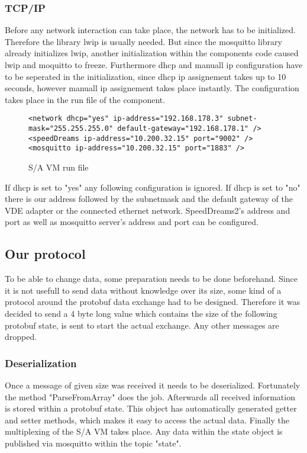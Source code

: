 \documentclass[paper=a4, fontsize=11pt]{scrartcl}
\begin{document}
  \subsubsection{TCP/IP} \label{tcpip}
Before any network interaction can take place, the network has to be initialized. Therefore the library lwip is usually needed. But since the mosquitto library already initializes lwip, another initialization within the components code caused lwip and moquitto to freeze.\newline
Furthermore dhcp and manuall ip configuration have to be seperated in the initialization, since dhcp ip assignement takes up to 10 seconds, however manuall ip assignement takes place instantly.
The configuration takes place in the run file of the component.\newline
\begin{figure}[!h]
  \centering
    \begin{verbatim}
<network dhcp="yes" ip-address="192.168.178.3" subnet-mask="255.255.255.0" default-gateway="192.168.178.1" />
<speedDreams ip-address="10.200.32.15" port="9002" />
<mosquitto ip-address="10.200.32.15" port="1883" />
    \end{verbatim}
    \caption{\tiny S/A VM run file}
  \end{figure}
If dhcp is set to "yes" any following configuration is ignored.\newline
If dhcp is set to "no" there is our address followed by the subnetmask and the default gateway of the VDE adapter or the connected ethernet network.\newline
SpeedDreams2's address and port as well as mosquitto server's address and port can be configured.
  \subsection{Our protocol} \label{ourprotocol}
To be able to change data, some preparation needs to be done beforehand. Since it is not usefull to send data without knowledge over its size, some kind of a protocol around the protobuf data exchange had to be designed. Therefore it was decided to send a 4 byte long value which contains the size of the following protobuf state, is sent to start the actual exchange. Any other messages are dropped.
  \subsubsection{Deserialization}
Once a message of given size was received it needs to be deserialized. Fortunately the method "ParseFromArray" does the job. Afterwards all received information is stored within a protobuf state. This object has automatically generated getter and setter methods, which makes it easy to access the actual data. Finally the multiplexing of the S/A VM takes place. Any data within the state object is published via mosquitto within the topic "state".
\end{document}
